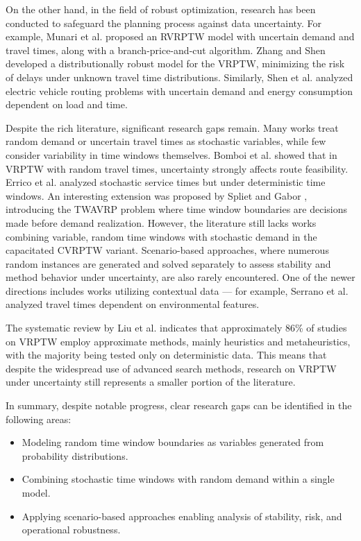 On the other hand, in the field of robust optimization, research has been conducted to safeguard the planning process against data uncertainty. For example, Munari et al. \cite{Munari2018} proposed an RVRPTW model with uncertain demand and travel times, along with a branch-price-and-cut algorithm. Zhang and Shen \cite{Zhang2021} developed a distributionally robust model for the VRPTW, minimizing the risk of delays under unknown travel time distributions. Similarly, Shen et al. \cite{Shen2022} analyzed electric vehicle routing problems with uncertain demand and energy consumption dependent on load and time.

Despite the rich literature, significant research gaps remain. Many works treat random demand or uncertain travel times as stochastic variables, while few consider variability in time windows themselves. Bomboi et al. \cite{Bomboi2022} showed that in VRPTW with random travel times, uncertainty strongly affects route feasibility. Errico et al. \cite{Errico2016} analyzed stochastic service times but under deterministic time windows. An interesting extension was proposed by Spliet and Gabor \cite{Spliet2014}, introducing the TWAVRP problem where time window boundaries are decisions made before demand realization. However, the literature still lacks works combining variable, random time windows with stochastic demand in the capacitated CVRPTW variant. Scenario-based approaches, where numerous random instances are generated and solved separately to assess stability and method behavior under uncertainty, are also rarely encountered. One of the newer directions includes works utilizing contextual data — for example, Serrano et al. \cite{Serano2024} analyzed travel times dependent on environmental features.

The systematic review by Liu et al. \cite{Liu2023} indicates that approximately 86\% of studies on VRPTW employ approximate methods, mainly heuristics and metaheuristics, with the majority being tested only on deterministic data. This means that despite the widespread use of advanced search methods, research on VRPTW under uncertainty still represents a smaller portion of the literature.

In summary, despite notable progress, clear research gaps can be identified in the following areas:
\begin{itemize}
    \item Modeling random time window boundaries as variables generated from probability distributions.
    \item Combining stochastic time windows with random demand within a single model.
    \item Applying scenario-based approaches enabling analysis of stability, risk, and operational robustness.
\end{itemize}

